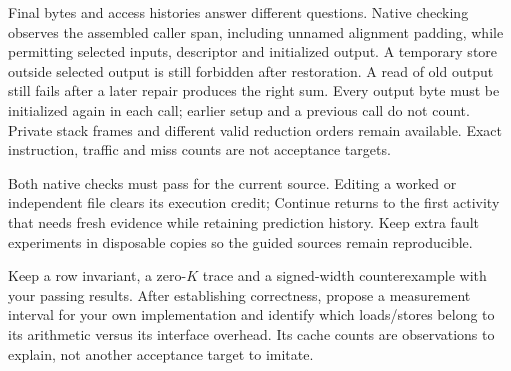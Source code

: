 Final bytes and access histories answer different questions. Native checking
observes the assembled caller span, including unnamed alignment padding, while
permitting selected inputs, descriptor and initialized output. A temporary store
outside selected output is still forbidden after restoration. A read of old
output still fails after a later repair produces the right sum. Every output
byte must be initialized again in each call; earlier setup and a previous call
do not count. Private stack frames and different valid reduction orders remain
available. Exact instruction, traffic and miss counts are not acceptance targets.

Both native checks must pass for the current source. Editing a worked or
independent file clears its execution credit; Continue returns to the first
activity that needs fresh evidence while retaining prediction history. Keep
extra fault experiments in disposable copies so the guided sources remain
reproducible.

Keep a row invariant, a zero-$K$ trace and a signed-width counterexample with your
passing results. After establishing correctness, propose a measurement interval
for your own implementation and identify which loads/stores belong to its
arithmetic versus its interface overhead. Its cache counts are observations to
explain, not another acceptance target to imitate.
